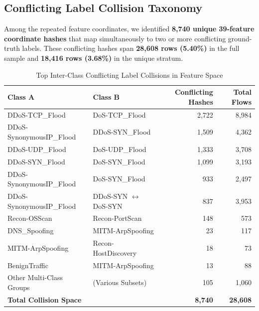 \documentclass[conference,10pt,twocolumn]{IEEEtran}
\begin{document}
\subsection{Conflicting Label Collision Taxonomy}
Among the repeated feature coordinates, we identified \textbf{8,740 unique 39-feature coordinate hashes} that map simultaneously to two or more conflicting ground-truth labels. These conflicting hashes span \textbf{28,608 rows (5.40\%)} in the full sample and \textbf{18,416 rows (3.68\%)} in the unique stratum.

\begin{table}[h]
\centering
\caption{Top Inter-Class Conflicting Label Collisions in Feature Space}
\label{tab:collision_taxonomy}
\small
\begin{tabular}{@{}llrr@{}}
\toprule
\textbf{Class A} & \textbf{Class B} & \textbf{Conflicting Hashes} & \textbf{Total Flows} \\ \midrule
DDoS-TCP\_Flood & DoS-TCP\_Flood & 2,722 & 8,984 \\
DDoS-SynonymousIP\_Flood & DDoS-SYN\_Flood & 1,509 & 4,362 \\
DDoS-UDP\_Flood & DoS-UDP\_Flood & 1,333 & 3,708 \\
DDoS-SYN\_Flood & DoS-SYN\_Flood & 1,099 & 3,193 \\
DDoS-SynonymousIP\_Flood & DoS-SYN\_Flood & 933 & 2,497 \\
DDoS-SynonymousIP\_Flood & DDoS-SYN $\leftrightarrow$ DoS-SYN & 837 & 3,953 \\
Recon-OSScan & Recon-PortScan & 148 & 573 \\
DNS\_Spoofing & MITM-ArpSpoofing & 23 & 117 \\
MITM-ArpSpoofing & Recon-HostDiscovery & 18 & 73 \\
BenignTraffic & MITM-ArpSpoofing & 13 & 88 \\
Other Multi-Class Groups & (Various Subsets) & 105 & 1,060 \\ \midrule
\textbf{Total Collision Space} & & \textbf{8,740} & \textbf{28,608} \\ \bottomrule
\end{tabular}
\end{table}
\end{document}
